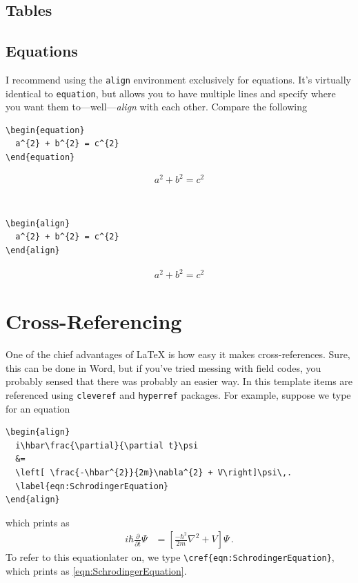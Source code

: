 \subsection{Tables}


\subsection{Equations}
I recommend using the \texttt{align} environment exclusively for equations. 
It's virtually identical to \texttt{equation}, but allows you to have multiple lines and specify where you want them to---well---\emph{align} with each other.
Compare the following\\
\begin{minipage}[t]{0.48\textwidth}
\small
\begin{verbatim}
\begin{equation}
  a^{2} + b^{2} = c^{2}
\end{equation}
\end{verbatim}
\begin{equation}
  a^{2} + b^{2} = c^{2}
\end{equation}
\end{minipage}
~
\begin{minipage}[t]{0.48\textwidth}
\small
\begin{verbatim}
\begin{align}
  a^{2} + b^{2} = c^{2}
\end{align}
\end{verbatim}
\begin{align}
  a^{2} + b^{2} = c^{2}
\end{align}
\end{minipage}


\section{Cross-Referencing}
One of the chief advantages of \LaTeX{} is how easy it makes cross-references.
Sure, this can be done in Word, but if you've tried messing with field codes, you probably sensed that there was probably an easier way.
In this template items are referenced using \texttt{cleveref} and \texttt{hyperref} packages.
For example, suppose we type for an equation
{\small
\begin{verbatim}
\begin{align}
  i\hbar\frac{\partial}{\partial t}\psi 
  &=
  \left[ \frac{-\hbar^{2}}{2m}\nabla^{2} + V\right]\psi\,.
  \label{eqn:SchrodingerEquation}
\end{align}
\end{verbatim}
}%
which prints as
\begin{align}
  i\hbar\frac{\partial}{\partial t}\Psi &= \left[ \frac{-\hbar^{2}}{2m}\nabla^{2} + V\right]\Psi\,.
  \label{eqn:SchrodingerEquation}
\end{align}
To refer to this equationlater on, we type \verb|\cref{eqn:SchrodingerEquation}|, which prints as \cref{eqn:SchrodingerEquation}.

